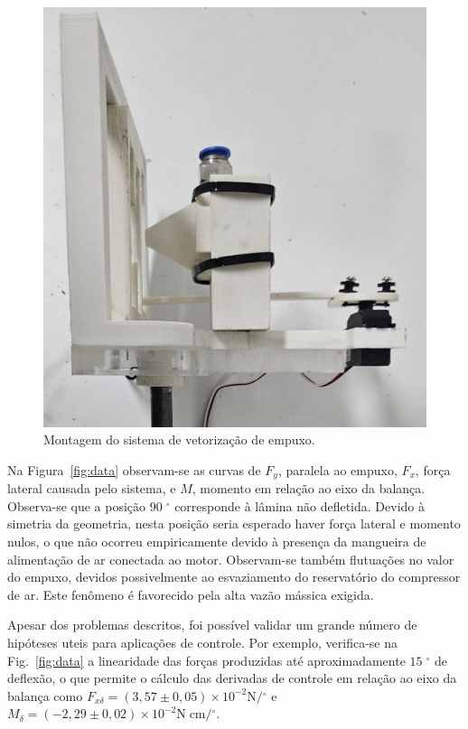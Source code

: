 \documentclass[
	article,			%
	10pt,				%
	oneside,			%
	a4paper,			%
  twocolumn,			%
	english,			%
	brazil,				%
	sumario=tradicional,
	]{abntex2}
\begin{document}
\begin{figure}[htbp]
  \centering
  \includegraphics[width=.7\linewidth]{../report/img/tvc_assembly_right_cropped.jpeg}
  \caption{Montagem do sistema de vetorização de empuxo.}\label{fig:assembled_system}
\end{figure}

Na Figura~\ref{fig:data} observam-se as curvas de \(F_y\), paralela ao empuxo, \(F_x\), força lateral causada pelo sistema, e \(M\), momento em relação ao eixo da balança. Observa-se que a posição \(90\;\mathrm{^\circ}\) corresponde à lâmina não defletida. Devido à simetria da geometria, nesta posição seria esperado haver força lateral e momento nulos, o que não ocorreu empiricamente devido à presença da mangueira de alimentação de ar conectada ao motor. Observam-se também flutuações no valor do empuxo, devidos possivelmente ao esvaziamento do reservatório do compressor de ar. Este fenômeno é favorecido pela alta vazão mássica exigida.

Apesar dos problemas descritos, foi possível validar um grande número de hipóteses uteis para aplicações de controle. Por exemplo, verifica-se na Fig.~\ref{fig:data} a linearidade das forças produzidas até aproximadamente \(15\;\mathrm{^\circ}\) de deflexão, o que permite o cálculo das derivadas de controle em relação ao eixo da balança como \(F_{x\delta} = (3,57 \pm 0,05)\times10^{-2} \mathrm{N} / \mathrm{^\circ}\) e \(M_\delta = (-2,29 \pm 0,02)\times10^{-2} \mathrm{N}\;\mathrm{cm} / \mathrm{^\circ}\).
\end{document}
